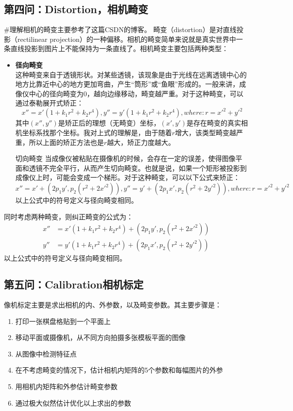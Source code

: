 \documentclass[UTF8]{ctexart}
\begin{document}
\subsection{第四问：Distortion，相机畸变}
\#理解相机的畸变主要参考了这篇CSDN的博客\cite{CSDNJessicajiel18830}。
畸变（distortion）是对直线投影（rectilinear projection）的一种偏移。相机的畸变简单来说就是真实世界中一条直线投影到图片上不能保持为一条直线了。相机畸变主要包括两种类型：
\begin{itemize}
  \item \textbf{径向畸变} \\
  这种畸变来自于透镜形状。对某些透镜，该现象是由于光线在远离透镜中心的地方比靠近中心的地方更加弯曲，产生“筒形”或“鱼眼”形成的。一般来讲，成像仪中心的径向畸变为0，越向边缘移动，畸变越严重。对于这种畸变，可以通过泰勒展开式矫正：
  $$
  x''=x'(1+k_1r^2+k_2r^4),
  y''=y'(1+k_1r^2+k_2r^4),
  where:r=x'^2+y'^2
  $$
  其中$(x'',y'')$是矫正后的理想（无畸变）坐标，$(x',y')$是存在畸变的真实相机坐标系找那个坐标。我对上式的理解是，由于随着$r$增大，该类型畸变越严重，所以上面的矫正方法也是$r$越大，矫正力度越大。
  \item[切向畸变] 当成像仪被粘贴在摄像机的时候，会存在一定的误差，使得图像平面和透镜不完全平行，从而产生切向畸变。也就是说，如果一个矩形被投影到成像仪上时，可能会变成一个梯形。对于这种畸变，可以以下公式来矫正：
  $$
  x''=x'+(2p_1y',p_2(r^2+2x'^2)),
  y''=y'+(2p_1x',p_2(r^2+2y'^2)),
  where:r=x'^2+y'^2
  $$
  以上公式中的符号定义与径向畸变相同。
\end{itemize}
同时考虑两种畸变，则纠正畸变的公式为：
\begin{align}
  x''&=x'(1+k_1r^2+k_2r^4)+(2p_1y',p_2(r^2+2x'^2))\\
  y''&=y'(1+k_1r^2+k_2r^4)+(2p_1x',p_2(r^2+2y'^2))
\end{align}
以上公式中的符号定义与径向畸变相同。
\subsection{第五问：Calibration相机标定}
像机标定主要是求出相机的内、外参数，以及畸变参数。其主要步骤是\cite{zhang2000flexible}：
\begin{enumerate}
  \item 打印一张棋盘格贴到一个平面上
  \item 移动平面或摄像机，从不同方向拍摄多张模板平面的图像
  \item 从图像中检测特征点
  \item 在不考虑畸变的情况下，估计相机内矩阵的5个参数和每幅图片的外参
  \item 用相机内矩阵和外参估计畸变参数
  \item 通过极大似然估计优化以上求出的参数
\end{enumerate}
\end{document}
